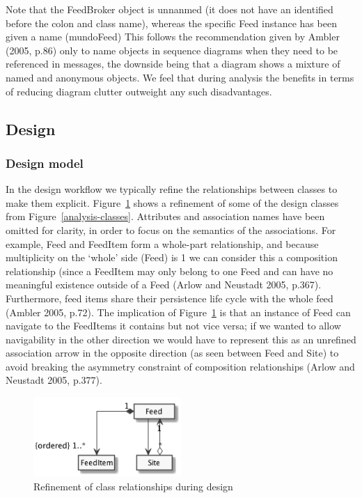 \documentclass[a4paper]{article}
\begin{document}
Note that the \textsf{FeedBroker} object is unnanmed (it does not have an identified before the colon and class name), whereas the specific \textsf{Feed} instance has been given a name (\textsf{mundoFeed}) This follows the recommendation given by Ambler (2005, p.86) only to name objects in sequence diagrams when they need to be referenced in messages, the downside being that a diagram shows a mixture of named and anonymous objects. We feel that during analysis the benefits in terms of reducing diagram clutter outweight any such disadvantages.

\subsection{Design}

\subsubsection{Design model}

In the design workflow we typically refine the relationships between classes to make them explicit. Figure~\ref{design-classes} shows a refinement of some of the design classes from Figure~\ref{analysis-classes}. Attributes and association names have been omitted for clarity, in order to focus on the semantics of the associations. For example, \textsf{Feed} and \textsf{FeedItem} form a whole-part relationship, and because multiplicity on the `whole' side (\textsf{Feed}) is 1 we can consider this a composition relationship (since a \textsf{FeedItem} may only belong to one \textsf{Feed} and can have no meaningful existence outside of a \textsf{Feed} (Arlow and Neustadt 2005, p.367). Furthermore, feed items share their persistence life cycle with the whole feed (Ambler 2005, p.72). The implication of Figure~\ref{design-classes} is that an instance of \textsf{Feed} can navigate to the \textsf{FeedItem}s it contains but not vice versa; if we wanted to allow navigability in the other direction we would have to represent this as an unrefined association arrow in the opposite direction (as seen between \textsf{Feed} and \textsf{Site}) to avoid breaking the asymmetry constraint of composition relationships (Arlow and Neustadt 2005, p.377).

\begin{figure}
  \begin{center}
    \includegraphics[width=0.5\textwidth]{design-classes.png}
  \end{center}
  \label{design-classes}
  \caption{Refinement of class relationships during design}
\end{figure}
\end{document}

